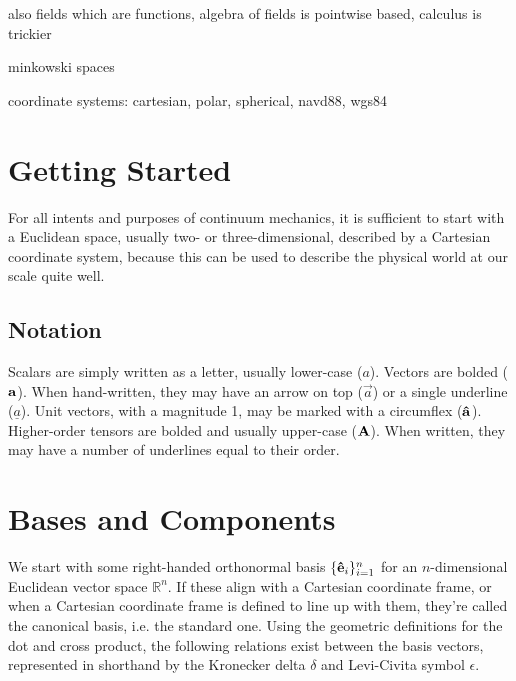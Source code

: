 also fields which are functions, algebra of fields is pointwise based, calculus is trickier

minkowski spaces

coordinate systems: cartesian, polar, spherical, navd88, wgs84

















\section{Getting Started}

For all intents and purposes of continuum mechanics, it is sufficient to start with a Euclidean space, usually two- or three-dimensional, described by a Cartesian coordinate system, because this can be used to describe the physical world at our scale quite well.

\subsection{Notation}

Scalars are simply written as a letter, usually lower-case ($a$). Vectors are bolded ($\vb{a}$). When hand-written, they may have an arrow on top ($\vec{a}$) or a single underline ($\underline{a}$). Unit vectors, with a magnitude 1, may be marked with a circumflex ($\vu{a}$). Higher-order tensors are bolded and usually upper-case ($\vb{A}$). When written, they may have a number of underlines equal to their order.

\section{Bases and Components}

We start with some right-handed orthonormal basis $\{\vu{e}_{i}\}_{i = 1}^{n}$ for an $n$-dimensional Euclidean vector space $\mathbb{R}^{n}$. If these align with a Cartesian coordinate frame, or when a Cartesian coordinate frame is defined to line up with them, they're called the canonical basis, i.e. the standard one. Using the geometric definitions for the dot and cross product, the following relations exist between the basis vectors, represented in shorthand by the Kronecker delta $\delta$ and Levi-Civita symbol $\epsilon$.

